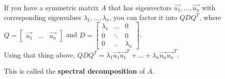 If you have a symmetric matrix $A$ that has eigenvectors $\Vec{u_1}, ..., \Vec{u_n}$ with corresponding eigenvalues $\lambda_1, ..., \lambda_n$, you can factor it into $QDQ^T$, where $Q = \begin{bmatrix}\Vec{u_1} & ... & \Vec{u_n}\end{bmatrix}$ and $D = \begin{bmatrix}\lambda_1 & ... & 0 \\ 0 & \ddots & 0 \\ 0 & .. & \lambda_n\end{bmatrix}$.\\
Using that thing above, $QDQ^T = \lambda_1\Vec{u_1}\Vec{u_1}^T + ... + \lambda_n\Vec{u_n}\Vec{u_n}^T$.

This is called the \textbf{spectral decomposition} of $A$.

